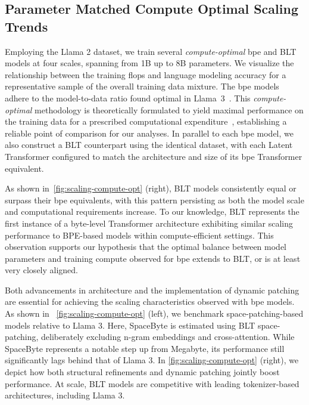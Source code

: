 \subsection{Parameter Matched Compute Optimal Scaling Trends}
\label{section:parameter-matched-scaling}
Employing the Llama 2 dataset, we train several \textit{compute-optimal} bpe and {\textsc BLT} models at four scales, spanning from 1B up to 8B parameters. We visualize the relationship between the training flops and language modeling accuracy for a representative sample of the overall training data mixture. The bpe models adhere to the model-to-data ratio found optimal in Llama~3~\citep{dubey2024llama}. This \textit{compute-optimal} methodology is theoretically formulated to yield maximal performance on the training data for a prescribed computational expenditure~\citep{hoffmann2022training}, establishing a reliable point of comparison for our analyses. In parallel to each bpe model, we also construct a {\textsc BLT} counterpart using the identical dataset, with each Latent Transformer configured to match the architecture and size of its bpe Transformer equivalent.

As shown in~\autoref{fig:scaling-compute-opt} (right), {\textsc BLT} models consistently equal or surpass their bpe equivalents, with this pattern persisting as both the model scale and computational requirements increase. To our knowledge, {\textsc BLT} represents the first instance of a byte-level Transformer architecture exhibiting similar scaling performance to BPE-based models within compute-efficient settings. This observation supports our hypothesis that the optimal balance between model parameters and training compute observed for bpe extends to {\textsc BLT}, or is at least very closely aligned.

Both advancements in architecture and the implementation of dynamic patching are essential for achieving the scaling characteristics observed with bpe models. As shown in ~\autoref{fig:scaling-compute-opt} (left), we benchmark space-patching-based models relative to Llama 3. Here, SpaceByte \citep{slagle2024spacebyte} is estimated using {\textsc BLT} space-patching, deliberately excluding n-gram embeddings and cross-attention. While SpaceByte represents a notable step up from Megabyte, its performance still significantly lags behind that of Llama 3. In \autoref{fig:scaling-compute-opt} (right), we depict how both structural refinements and dynamic patching jointly boost performance. At scale, {\textsc BLT} models are competitive with leading tokenizer-based architectures, including Llama 3.

